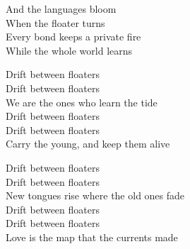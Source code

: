 \begin{lyrics}
And the languages bloom\\
When the floater turns\\
Every bond keeps a private fire\\
While the whole world learns

Drift between floaters\\
Drift between floaters\\
We are the ones who learn the tide\\
Drift between floaters\\
Drift between floaters\\
Carry the young, and keep them alive

Drift between floaters\\
Drift between floaters\\
New tongues rise where the old ones fade\\
Drift between floaters\\
Drift between floaters\\
Love is the map that the currents made
\end{lyrics}

